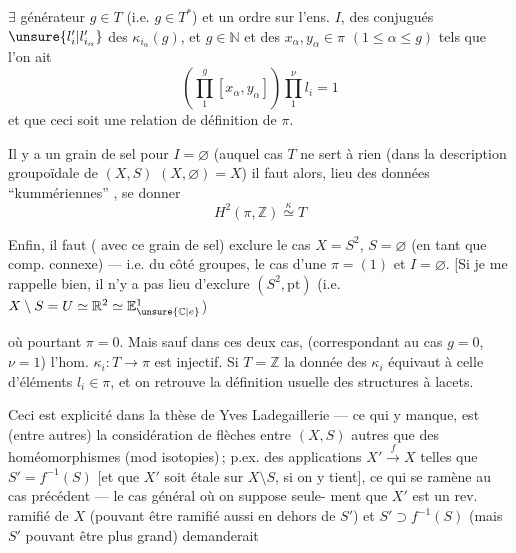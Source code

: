 
$\exists$ générateur $g\in T$ (i.e. $g\in T^*$) et un ordre 
sur l'ens. $I$,  des conjugués
$\unsure{l_i'|l_{i_\alpha}'}$ des $\kappa_{i_\alpha}(g)$, et $g\in\mathbb N$ et des $x_\alpha,y_\alpha\in\pi$
$(1\leq\alpha\leq g)$ tels que l'on ait
\[
\left(\prod_1^g[x_\alpha,y_\alpha]\right)\prod_1^{\nu}l_i=1
\]
et que ceci soit une relation de définition
de $\pi$.

Il y a  un grain de sel pour $I=\varnothing$
(auquel cas $T$ ne sert à rien  (dans la
description groupoïdale de $(X,S)$ \unsure{$\simeq$|$=$} $(X,\varnothing)=X$)
il faut alors,  lieu des données
``kummériennes'' \inserted{$\kappa$}, se donner
\[
H^2(\pi,\mathbb Z)\overset{\kappa}{\simeq}T
\]

Enfin, il faut 
( avec ce grain de sel) exclure le cas $X=S^2$, $S=\varnothing$
(en tant que comp. connexe) --- i.e.
du côté groupes, le cas d'une 
$\pi=(1)$  et $I=\varnothing$.
[Si je me rappelle bien, il n'y a pas lieu
d'exclure $(S^2,\mathrm{pt})$ (i.e. $X\setminus S=U\simeq\mathbb R^2\simeq\mathbb E^1_{\unsure{\mathbb C|e}}$)


où pourtant  $\pi=0$. Mais sauf dans ces
deux cas,  (correspondant
au cas $g=0$, $\nu=1$) l'hom. $\kappa_i:T\longrightarrow\pi$
est injectif. Si $T=\mathbb Z$ la donnée des $\kappa_i$
équivaut à celle d'éléments $l_i\in\pi$, et on
retrouve la définition usuelle des
structures à lacets.

Ceci est explicité dans la thèse de
Yves Ladegaillerie --- ce qui y manque, est
(entre autres) la considération de flèches
entre $(X,S)$ autres que des homéomorphismes
(mod isotopies)\,; p.ex. des applications 
 $X'\xrightarrow{f}X$ telles que $S'=f^{-1}(S)$
[et que $X'$ soit étale sur $X\setminus S$, si on y tient\unsure{!}],
ce qui se ramène au cas précédent
--- le cas  général où on suppose seule-
ment que $X'$ est un rev. ramifié
de $X$ (pouvant être ramifié aussi en
dehors de $S'$) et $S'\supset f^{-1}(S)$ (mais $S'$
pouvant être plus grand) demanderait

